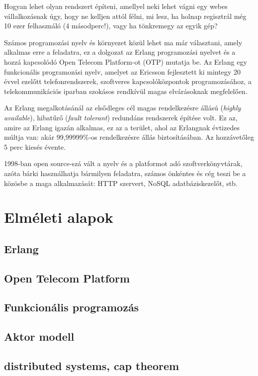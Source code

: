 \documentclass[12pt, a4paper, oneside]{book}
\begin{document}
Hogyan lehet olyan rendszert építeni, amellyel neki lehet vágni egy webes
vállalkozásnak úgy, hogy ne kelljen attól félni, mi lesz, ha holnap regisztrál
még 10 ezer felhasználó (4 másodperc!), vagy ha tönkremegy az egyik gép?

Számos programozási nyelv és környezet közül lehet ma már választani, amely
alkalmas erre a feladatra, ez a dolgozat az Erlang programozási nyelvet és a
hozzá kapcsolódó Open Telecom Platform-ot (OTP) mutatja be. Az Erlang egy
funkcionális programozási nyelv, amelyet az Ericsson fejlesztett ki mintegy 20
évvel ezelőtt telefonrendszerek, szoftveres kapcsolóközpontok programozásához,
a telekommunikációs iparban szokásos rendkívül magas elvárásoknak megfelelően. 

Az Erlang megalkotásánál az elsődleges cél magas rendelkezésre állású
(\emph{highly available}), hibatűrő (\emph{fault tolerant}) redundáns
rendszerek építése volt. Ez az, amire az Erlang igazán alkalmas, ez az a
terület, ahol az Erlangnak évtizedes múltja van: akár 99,99999\%-os
rendelkezésre állás biztosításában. Az hozzávetőleg 5 perc kiesés évente.

1998-ban open source-szá vált a nyelv és a platformot adó
szoftverkönyvtárak, azóta bárki használhatja bármilyen feladatra, számos
önkéntes és cég teszi be a közösbe a maga alkalmazását: HTTP szervert, NoSQL
adatbáziskezelőt, stb.

\newpage

\chapter{Elméleti alapok}
\section{Erlang}
\section{Open Telecom Platform}
\section{Funkcionális programozás}
\section{Aktor modell}
\section{distributed systems, cap theorem}
\end{document}
